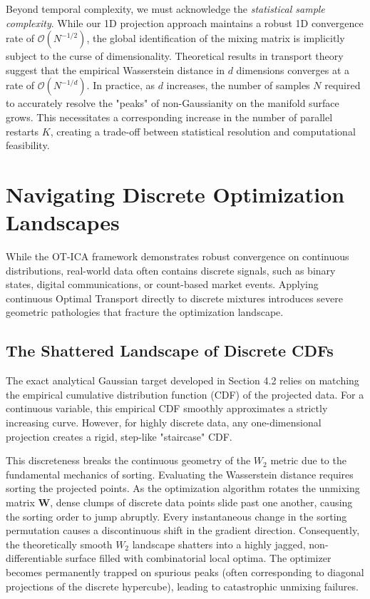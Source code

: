 \documentclass[12pt,a4paper,twoside,openany]{book}
\begin{document}
Beyond temporal complexity, we must acknowledge the \textit{statistical sample complexity}. While our 1D projection approach maintains a robust 1D convergence rate 
of $\mathcal{O}(N^{-1/2})$, the global identification of the mixing matrix is implicitly subject to the curse of dimensionality. Theoretical results in transport theory suggest 
that the empirical Wasserstein distance in $d$ dimensions converges at a rate of $\mathcal{O}(N^{-1/d})$. In practice, as $d$ increases, the number of samples $N$ required to 
accurately resolve the "peaks" of non-Gaussianity on the manifold surface grows. This necessitates a corresponding increase in the number of parallel restarts $K$, creating 
a trade-off between statistical resolution and computational feasibility.

\section{Navigating Discrete Optimization Landscapes}
While the OT-ICA framework demonstrates robust convergence on continuous distributions, real-world data often contains discrete signals, such as binary states, 
digital communications, or count-based market events. Applying continuous Optimal Transport directly to discrete mixtures introduces severe geometric pathologies 
that fracture the optimization landscape.

\subsection{The Shattered Landscape of Discrete CDFs}
The exact analytical Gaussian target developed in Section 4.2 relies on matching the empirical cumulative distribution function (CDF) of the projected data. 
For a continuous variable, this empirical CDF smoothly approximates a strictly increasing curve. However, for highly discrete data, any one-dimensional 
projection creates a rigid, step-like "staircase" CDF. 

This discreteness breaks the continuous geometry of the $W_2$ metric due to the fundamental mechanics of sorting. Evaluating the Wasserstein distance requires 
sorting the projected points. As the optimization algorithm rotates the unmixing matrix $\mathbf{W}$, dense clumps of discrete data points slide past one another, 
causing the sorting order to jump abruptly. Every instantaneous change in the sorting permutation causes a discontinuous shift in the gradient direction. 
Consequently, the theoretically smooth $W_2$ landscape shatters into a highly jagged, non-differentiable surface filled with combinatorial local optima. 
The optimizer becomes permanently trapped on spurious peaks (often corresponding to diagonal projections of the discrete hypercube), leading to catastrophic unmixing failures.
\end{document}
